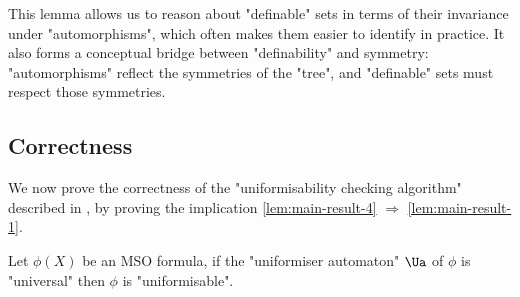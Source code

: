 \documentclass[a4paper,UKenglish,cleveref, autoref, thm-restate]{lipics-v2021}
\begin{document}
This lemma allows us to reason about "definable" sets in terms of their invariance under "automorphisms",
which often makes them easier to identify in practice. It also forms a conceptual bridge between "definability" and symmetry:
"automorphisms" reflect the symmetries of the "tree", and "definable" sets must respect those symmetries.


\subsection{Correctness}\label{sec:correctness}

We now prove the correctness of the "uniformisability checking algorithm" described in , by proving the
implication \ref{lem:main-result-4} $\Rightarrow$ \ref{lem:main-result-1}.

\begin{lemma}
	Let $\phi(X)$ be an MSO formula, if the "uniformiser automaton" $\Ua$ of $\phi$ is "universal" then $\phi$ is "uniformisable".
\end{lemma}
\end{document}
